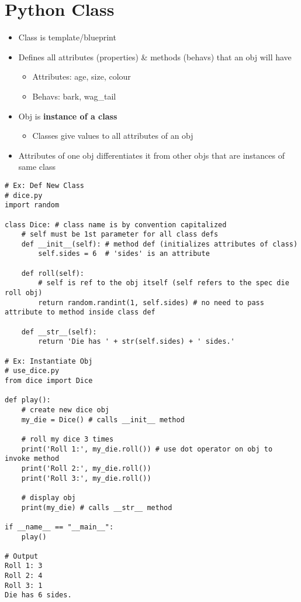 \documentclass{article}
\begin{document}
\section{Python Class}
    \begin{multicols}{2}
        \begin{itemize}
            \item Class is template/blueprint
            \item Defines all attributes (properties) \& methods (behavs) that an obj will have
                \begin{itemize}
                    \item Attributes: age, size, colour
                    \item Behavs: bark, wag\_tail
                \end{itemize}
            \item Obj is \textbf{instance of a class}
                \begin{itemize}
                    \item Classes give values to all attributes of an obj
                \end{itemize}
            \item Attributes of one obj differentiates it from other objs that are instances of same class
        \end{itemize}
    \end{multicols}
\vspace{-2em}
\begin{lstlisting}
# Ex: Def New Class
# dice.py
import random

class Dice: # class name is by convention capitalized
    # self must be 1st parameter for all class defs
    def __init__(self): # method def (initializes attributes of class)
        self.sides = 6  # 'sides' is an attribute
    
    def roll(self):
        # self is ref to the obj itself (self refers to the spec die roll obj)
        return random.randint(1, self.sides) # no need to pass attribute to method inside class def
    
    def __str__(self):
        return 'Die has ' + str(self.sides) + ' sides.'

# Ex: Instantiate Obj
# use_dice.py
from dice import Dice

def play():
    # create new dice obj
    my_die = Dice() # calls __init__ method
    
    # roll my dice 3 times
    print('Roll 1:', my_die.roll()) # use dot operator on obj to invoke method
    print('Roll 2:', my_die.roll())
    print('Roll 3:', my_die.roll())
    
    # display obj
    print(my_die) # calls __str__ method

if __name__ == "__main__":
    play()

# Output
Roll 1: 3
Roll 2: 4
Roll 3: 1
Die has 6 sides.
\end{lstlisting}
\end{document}

